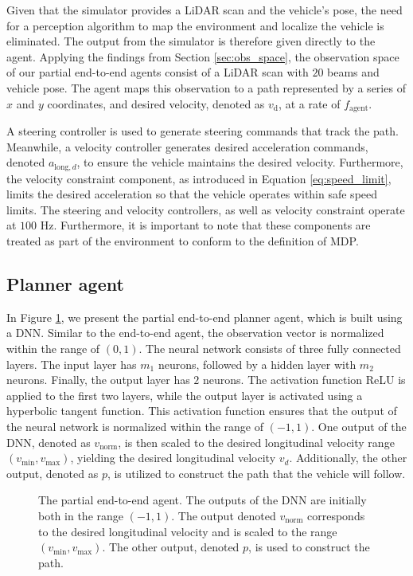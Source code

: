 Given that the simulator provides a LiDAR scan and the vehicle's pose, the need for a perception algorithm to map the environment and localize the vehicle is eliminated. 
The output from the simulator is therefore given directly to the agent.
Applying the findings from Section \ref{sec:obs_space}, the observation space of our partial end-to-end agents consist of a LiDAR scan with $20$ beams and vehicle pose.
The agent maps this observation to a path represented by a series of $x$ and $y$ coordinates, and desired velocity, denoted as $v_{\text{d}}$, at a rate of $f_{\text{agent}}$. 

A steering controller is used to generate steering commands that track the path.
Meanwhile, a velocity controller generates desired acceleration commands, denoted $a_{\text{long},d}$, to ensure the vehicle maintains the desired velocity.
Furthermore, the velocity constraint component, as introduced in Equation \ref{eq:speed_limit}, limits the desired acceleration so that the vehicle operates within safe speed limits. 
The steering and velocity controllers, as well as velocity constraint operate at $100$ Hz.
Furthermore, it is important to note that these components are treated as part of the environment to conform to the definition of MDP. 

\subsection{Planner agent}

In Figure \ref{fig:steer_vel_agent}, we present the partial end-to-end planner agent, which is built using a DNN. 
Similar to the end-to-end agent, the observation vector is normalized within the range of $(0,1)$.
The neural network consists of three fully connected layers. The input layer has $m_1$ neurons, followed by a hidden layer with $m_2$ neurons. Finally, the output layer has $2$ neurons. 
The activation function ReLU is applied to the first two layers, while the output layer is activated using a hyperbolic tangent function. 
This activation function ensures that the output of the neural network is normalized within the range of $(-1, 1)$.
One output of the DNN, denoted as $v_{\text{norm}}$, is then scaled to the desired longitudinal velocity range $(v_{\text{min}}, v_{\text{max}})$, yielding the desired longitudinal velocity $v_{d}$. 
Additionally, the other output, denoted as $p$, is utilized to construct the path that the vehicle will follow.


\begin{figure}[htb!]
    \centering
    
    \caption[The partial end-to-end planner agent]{The partial end-to-end agent. The outputs of the DNN are initially both in the range $(-1,1)$. The output denoted $v_{\text{norm}}$ corresponds to the desired longitudinal velocity and is scaled to the range $(v_{\text{min}}, v_{\text{max}})$. The other output, denoted $p$, is used to construct the path.}
    \label{fig:steer_vel_agent}
\end{figure}


